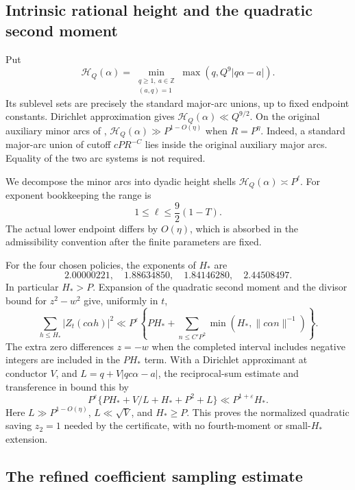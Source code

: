 \documentclass[11pt,letterpaper]{article}
\numberwithin{equation}{section}
\begin{document}
\subsection{Intrinsic rational height and the quadratic second moment}

Put
\[
 \mathcal H_Q(\alpha)=\min_{\substack{q\ge1,\ a\in\mathbb Z\\(a,q)=1}}
                     \max(q,Q^9|q\alpha-a|).
\]
Its sublevel sets are precisely the standard major-arc unions, up to
fixed endpoint constants.  Dirichlet approximation gives
$\mathcal H_Q(\alpha)\ll Q^{9/2}$.  On the original auxiliary minor
arcs of \cite[Definition 4.9]{VW95},
$\mathcal H_Q(\alpha)\gg P^{1-O(\eta)}$ when $R=P^\eta$.
Indeed, a standard major-arc union of cutoff $cPR^{-C}$ lies inside the
original auxiliary major arcs.  Equality of the two arc systems is not
required.

We decompose the minor arcs into dyadic height shells
$\mathcal H_Q(\alpha)\asymp P^\ell$.  For exponent bookkeeping the
range is
\begin{equation}
                    1\le\ell\le \frac92(1-T).
 \label{eq:height-range}
\end{equation}
The actual lower endpoint differs by $O(\eta)$, which is absorbed in the
admissibility convention after the finite parameters are fixed.

For the four chosen policies, the exponents of $H_*$ are
\[
 2.00000221,\quad 1.88634850,\quad 1.84146280,\quad 2.44508497.
\]
In particular $H_*>P$.  Expansion of the quadratic second moment and the
divisor bound for $z^2-w^2$ give, uniformly in $t$,
\[
 \sum_{h\le H_*}|Z_t(c\alpha h)|^2
 \ll P^\varepsilon\left\{PH_*+
       \sum_{n\le C'P^2}\min(H_*,\|c\alpha n\|^{-1})\right\}.
\]
The extra zero differences $z=-w$ when the completed interval includes
negative integers are included in the $PH_*$ term. With a Dirichlet
approximant at conductor $V$, and $L=q+V|qc\alpha-a|$, the
reciprocal-sum estimate and transference in
\cite[Lemma 4.4, proof following (4.13)]{VW95} bound this by
\[
 P^\varepsilon\{PH_*+V/L+H_*+P^2+L\}\ll P^{1+\varepsilon}H_*.
\]
Here $L\gg P^{1-O(\eta)}$, $L\ll\sqrt V$, and $H_*\ge P$.
This proves the normalized quadratic saving $z_2=1$ needed by the
certificate, with no fourth-moment or small-$H_*$ extension.

\subsection{The refined coefficient sampling estimate}
\end{document}
